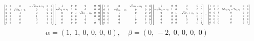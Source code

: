 \documentclass[11pt]{article}
\theoremstyle{definition}
\begin{document}
\[
\scaletoalign{\textwidth}{{\left[\begin{matrix}1 & 0 & 0 & - \sqrt{d} u_{0} + u_{1} & 0 & 0\\0 & 1 & \sqrt{d} u_{0} + u_{1} & 0 & 0 & 0\\0 & 0 & 1 & 0 & 0 & 0\\0 & 0 & 0 & 1 & 0 & 0\\0 & 0 & 0 & 0 & 1 & 0\\0 & 0 & 0 & 0 & 0 & 1\end{matrix}\right]} {\left[\begin{matrix}1 & 0 & 0 & 0 & 0 & 0\\\sqrt{d} v_{1} + v_{0} & 1 & 0 & 0 & 0 & 0\\0 & 0 & 1 & \sqrt{d} v_{1} - v_{0} & 0 & 0\\0 & 0 & 0 & 1 & 0 & 0\\0 & 0 & 0 & 0 & 1 & 0\\0 & 0 & 0 & 0 & 0 & 1\end{matrix}\right]} {\left[\begin{matrix}1 & 0 & 0 & \sqrt{d} u_{0} - u_{1} & 0 & 0\\0 & 1 & - \sqrt{d} u_{0} - u_{1} & 0 & 0 & 0\\0 & 0 & 1 & 0 & 0 & 0\\0 & 0 & 0 & 1 & 0 & 0\\0 & 0 & 0 & 0 & 1 & 0\\0 & 0 & 0 & 0 & 0 & 1\end{matrix}\right]} {\left[\begin{matrix}1 & 0 & 0 & 0 & 0 & 0\\- \sqrt{d} v_{1} - v_{0} & 1 & 0 & 0 & 0 & 0\\0 & 0 & 1 & - \sqrt{d} v_{1} + v_{0} & 0 & 0\\0 & 0 & 0 & 1 & 0 & 0\\0 & 0 & 0 & 0 & 1 & 0\\0 & 0 & 0 & 0 & 0 & 1\end{matrix}\right]} = {\left[\begin{matrix}1 & 0 & 0 & 0 & 0 & 0\\0 & 1 & 0 & 2 d u_{0} v_{1} - 2 u_{1} v_{0} & 0 & 0\\0 & 0 & 1 & 0 & 0 & 0\\0 & 0 & 0 & 1 & 0 & 0\\0 & 0 & 0 & 0 & 1 & 0\\0 & 0 & 0 & 0 & 0 & 1\end{matrix}\right]}}
\]
\[
\alpha = \left( 1, \  1, \  0, \  0, \  0, \  0\right), \quad \beta = \left( 0, \  -2, \  0, \  0, \  0, \  0\right)
\]
\end{document}
